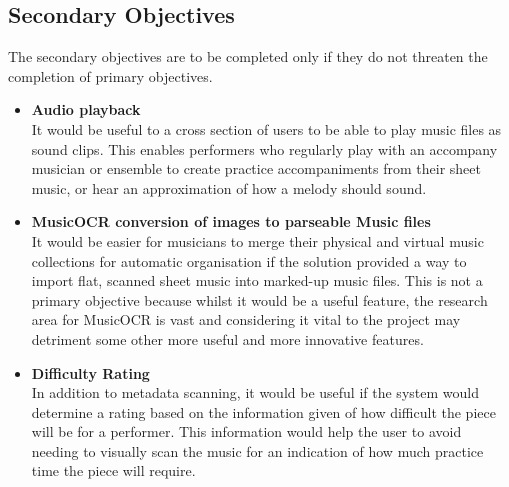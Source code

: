 \subsection{Secondary Objectives}
The secondary objectives are to be completed only if they do not threaten the completion of primary objectives.

\begin{itemize}
    \item \textbf{Audio playback}\\
    It would be useful to a cross section of users to be able to play music files as sound clips. This enables performers who regularly play with an accompany musician or ensemble to create practice accompaniments from their sheet music, or hear an approximation of how a melody should sound.
    \item \textbf{MusicOCR conversion of images to parseable Music files}\\
It would be easier for musicians to merge their physical and virtual music collections for automatic organisation if the solution provided a way to import flat, scanned sheet music into marked-up music files. This is not a primary objective because whilst it would be a useful feature, the research area for MusicOCR is vast and considering it vital to the project may detriment some other more useful and more innovative features. 
	\item \textbf{Difficulty Rating}\\
	In addition to metadata scanning, it would be useful if the system would determine a rating based on the information given of how difficult the piece will be for a performer. This information would help the user to avoid needing to visually scan the music for an indication of how much practice time the piece will require.
\end{itemize}

